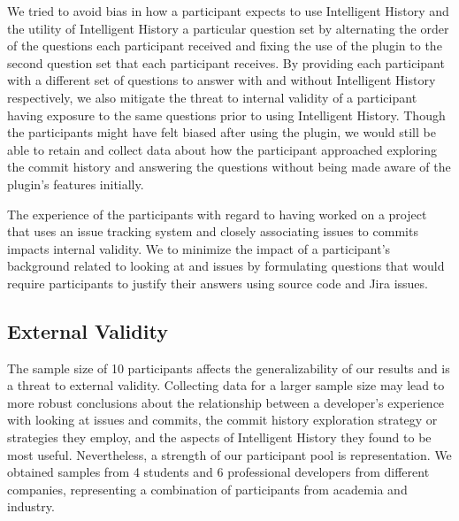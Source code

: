 We tried to avoid bias in how a participant expects to use Intelligent History 
and the utility of Intelligent History  a particular question set 
by alternating the order of the questions each participant received 
and fixing the use of the plugin to the second question set that each participant receives.
By providing each participant with a different set of questions to answer with 
and without Intelligent History respectively,
we also mitigate the threat to internal validity of a participant having 
exposure to the same questions prior to using Intelligent History.
Though the participants might have felt biased after using the plugin,
we would still be able to retain and collect data about how the participant approached 
exploring the commit history and answering the questions without being made aware of the plugin's features initially.

The experience of the participants with regard to having worked on a project that uses an issue tracking system 
and closely associating issues to commits impacts internal validity.
We  to minimize the impact of a participant's background related 
to looking at  and issues by formulating questions 
that would require participants to justify their answers 
using source code and  Jira issues.

\subsection{External Validity}

The sample size of 10 participants affects the generalizability of our results and is a threat to external validity.
Collecting data for a larger sample size may lead to more robust conclusions about the relationship 
between a developer's experience with looking at issues and commits,
the commit history exploration strategy or strategies they employ, 
and the aspects of Intelligent History they found to be most useful.
Nevertheless, a strength of our participant pool is representation. 
We obtained samples from 4 students and 6 professional developers from different companies,
representing a combination of participants from academia and industry.

